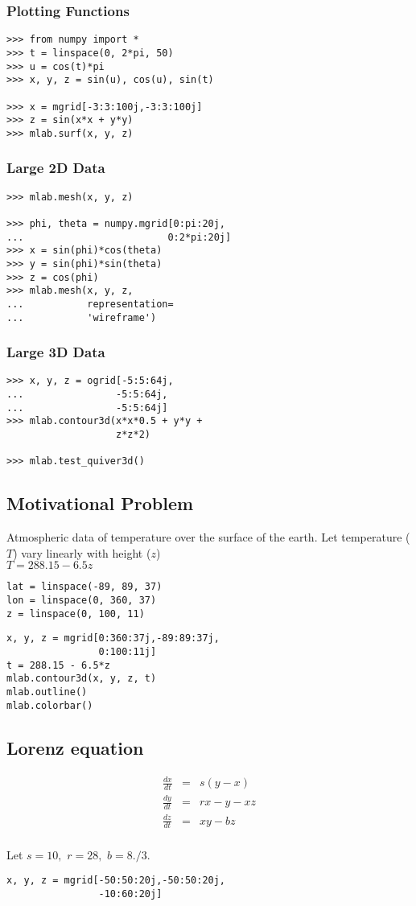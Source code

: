 \documentclass[12pt]{article}
\begin{document}
\subsubsection{Plotting Functions}
\begin{verbatim}
>>> from numpy import *
>>> t = linspace(0, 2*pi, 50)
>>> u = cos(t)*pi
>>> x, y, z = sin(u), cos(u), sin(t)

>>> x = mgrid[-3:3:100j,-3:3:100j]
>>> z = sin(x*x + y*y)
>>> mlab.surf(x, y, z)
\end{verbatim}

\subsubsection{Large 2D Data}
\begin{verbatim}
>>> mlab.mesh(x, y, z)

>>> phi, theta = numpy.mgrid[0:pi:20j, 
...                         0:2*pi:20j]
>>> x = sin(phi)*cos(theta)
>>> y = sin(phi)*sin(theta)
>>> z = cos(phi)
>>> mlab.mesh(x, y, z, 
...           representation=
...           'wireframe')
\end{verbatim}

\subsubsection{Large 3D Data}
\begin{verbatim}
>>> x, y, z = ogrid[-5:5:64j, 
...                -5:5:64j, 
...                -5:5:64j]
>>> mlab.contour3d(x*x*0.5 + y*y + 
                   z*z*2)

>>> mlab.test_quiver3d()
\end{verbatim}

\subsection{Motivational Problem}
Atmospheric data of temperature over the surface of the earth. Let temperature ($T$) vary linearly with height ($z$)\\
$T = 288.15 - 6.5z$

\begin{verbatim}
lat = linspace(-89, 89, 37)
lon = linspace(0, 360, 37)
z = linspace(0, 100, 11)
\end{verbatim}

\begin{verbatim}
x, y, z = mgrid[0:360:37j,-89:89:37j,
                0:100:11j]
t = 288.15 - 6.5*z
mlab.contour3d(x, y, z, t)
mlab.outline()
mlab.colorbar()
\end{verbatim}

\subsection{Lorenz equation}
\begin{eqnarray*}
\frac{d x}{dt} &=& s (y-x)\\
\frac{d y}{d t} &=& rx -y -xz\\
\frac{d z}{d t} &=& xy - bz\\
\end{eqnarray*}

Let $s=10,$
$r=28,$ 
$b=8./3.$

\begin{verbatim}
x, y, z = mgrid[-50:50:20j,-50:50:20j,
                -10:60:20j]

\end{verbatim}
\end{document}
